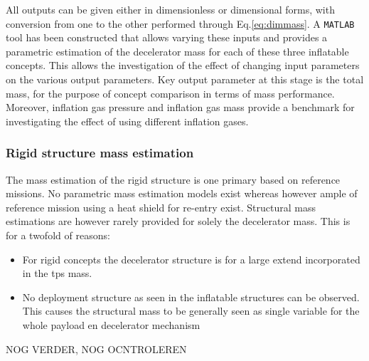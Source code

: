 All outputs can be given either in dimensionless or dimensional forms, with conversion from one to the other performed through Eq.\ref{eq:dimmass}. A \texttt{MATLAB} tool has been constructed that allows varying these inputs and provides a parametric estimation of the decelerator mass for each of these three inflatable concepts. This allows the investigation of the effect of changing input parameters on the various output parameters. Key output parameter at this stage is the total mass, for the purpose of concept comparison in terms of mass performance. Moreover, inflation gas pressure and inflation gas mass provide a benchmark for investigating the effect of using different inflation gases.


\subsubsection{Rigid structure mass estimation}

The mass estimation of the rigid structure is one primary based on reference missions. No parametric mass estimation models exist whereas however ample of reference mission using a heat shield for re-entry exist. Structural mass estimations are however rarely provided for solely the decelerator mass. This is for a twofold of reasons:

\begin{itemize}
\item For rigid concepts the decelerator structure is for a large extend incorporated in the \acrfull{tps} mass.
\item No deployment structure as seen in the inflatable structures can be observed. This causes the structural mass to be generally seen as single variable for the whole payload en decelerator mechanism
\end{itemize}


NOG VERDER, NOG OCNTROLEREN

